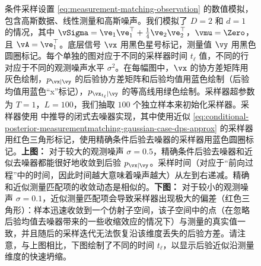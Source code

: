 \documentclass[../../book-main_zh.tex]{subfiles}
\begin{document}
\begin{figure}[tbp]
    \caption{条件采样设置 \eqref{eq:measurement-matching-observation} 的数值模拟，包含高斯数据、线性测量和高斯噪声。我们模拟了 $D=2$ 和 $d=1$ 的情况，其中 $\vSigma = \ve_1 \ve_1^\top + \tfrac{1}{4} \ve_2 \ve_2^\top$，$\vmu = \Zero$，且 $\vA = \ve_1^\top$。底层信号 $\vx$ 用黑色星号标记，测量值 $\vy$ 用黑色圆圈标记。每个单独的图对应于不同的采样器时间 $t_{\ell}$ 值，不同的行对应于不同的观测噪声水平 $\sigma^2$。在每幅图中，$\vx$ 的协方差矩阵用灰色绘制，$p_{\vx \mid \vy}$ 的后验协方差矩阵和后验均值用蓝色绘制（后验均值用蓝色“x”标记），$p_{\vx_{t_{\ell}} \mid \vy}$ 的等高线用绿色绘制。采样器超参数为 $T=1$，$L=100$，我们抽取 $100$ 个独立样本来初始化采样器。采样器使用  中推导的闭式去噪器实现，其中使用近似 \eqref{eq:conditional-posterior-measurementmatching-gaussian-case-dps-approx} 的采样器用红色三角形标记，使用精确条件后验去噪器的采样器用蓝色圆圈标记。\textbf{上图：} 对于较大的观测噪声 $\sigma = 0.5$，精确条件后验去噪器和近似去噪器都能很好地收敛到后验 $p_{\vx \mid \vy}$。采样时间（对应于“前向过程”中的时间，因此时间越大意味着噪声越大）从左到右递减。精确和近似测量匹配项的收敛动态是相似的。\textbf{下图：} 对于较小的观测噪声 $\sigma = 0.1$，近似测量匹配项会导致采样器出现极大的偏差（红色三角形）：样本迅速收敛到一个仿射子空间，该子空间中的点（在忽略后验均值去噪器带来的一些收缩效应的情况下）与测量的真实值一致，并且随后的采样迭代无法恢复沿该维度丢失的后验方差。请注意，与上图相比，下图绘制了不同的时间 $t_{\ell}$，以显示后验近似沿测量维度的快速坍缩。}
    \label{fig:conditional_sampling_computational_gaussian}
\end{figure}
\end{document}

